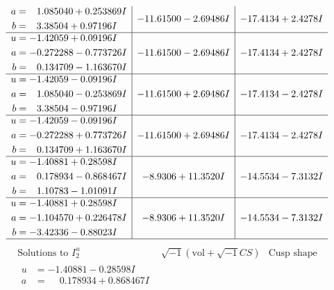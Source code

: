 \documentclass[1p]{elsarticle_modified}
\theoremstyle{definition}
\newcommand{\I}{\sqrt{-1}}
\begin{document}
$$\begin{array}{c|c|c}
\begin{aligned}
a &= \phantom{-}1.085040 + 0.253869 I \\
b &= \phantom{-}3.38504 + 0.97196 I\end{aligned}
 & -11.61500 - 2.69486 I & -17.4134 + 2.4278 I \\ \hline\begin{aligned}
u &= -1.42059 + 0.09196 I \\
a &= -0.272288 - 0.773726 I \\
b &= \phantom{-}0.134709 - 1.163670 I\end{aligned}
 & -11.61500 - 2.69486 I & -17.4134 + 2.4278 I \\ \hline\begin{aligned}
u &= -1.42059 - 0.09196 I \\
a &= \phantom{-}1.085040 - 0.253869 I \\
b &= \phantom{-}3.38504 - 0.97196 I\end{aligned}
 & -11.61500 + 2.69486 I & -17.4134 - 2.4278 I \\ \hline\begin{aligned}
u &= -1.42059 - 0.09196 I \\
a &= -0.272288 + 0.773726 I \\
b &= \phantom{-}0.134709 + 1.163670 I\end{aligned}
 & -11.61500 + 2.69486 I & -17.4134 - 2.4278 I \\ \hline\begin{aligned}
u &= -1.40881 + 0.28598 I \\
a &= \phantom{-}0.178934 - 0.868467 I \\
b &= \phantom{-}1.10783 - 1.01091 I\end{aligned}
 & -8.9306 + 11.3520 I & -14.5534 - 7.3132 I \\ \hline\begin{aligned}
u &= -1.40881 + 0.28598 I \\
a &= -1.104570 + 0.226478 I \\
b &= -3.42336 - 0.88023 I\end{aligned}
 & -8.9306 + 11.3520 I & -14.5534 - 7.3132 I\\
 \hline 
 \end{array}$$\newpage$$\begin{array}{c|c|c}  
\text{Solutions to }I^u_{2}& \I (\text{vol} + \sqrt{-1}CS) & \text{Cusp shape}\\
 \hline 
\begin{aligned}
u &= -1.40881 - 0.28598 I \\
a &= \phantom{-}0.178934 + 0.868467 I \\

\end{aligned}
\end{array}$$
\end{document}
